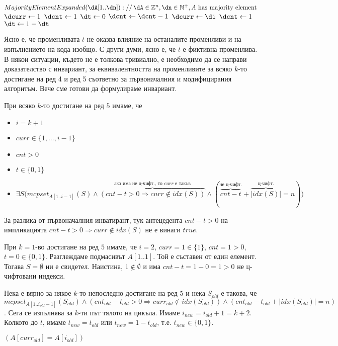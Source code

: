 \begin{solution}
\begin{pseudocode}
		$MajorityElementExpanded(\dA[1..\dn])://\,\dA\in\mathbb{Z}^n,\dn\in\mathbb{N}^+,A\text{ has majority element}$
		\Mybegin
		{	
			$\dcurr\leftarrow1$\;
			$\dcnt\leftarrow1$\;
			\textcolor{red}{$\dt\leftarrow0$\;}
			{
				\Else
				{
					$\dcnt\leftarrow\dcnt-1$\;
					{
						$\dcurr\leftarrow\di$\;
						$\dcnt\leftarrow1$\;
						\textcolor{red}{$\dt\leftarrow1-\dt$\;}
					}
				}
			}
			\KwRet{$\dA[\dcurr]$\;}
		}
	\end{pseudocode}
	Ясно е, че променливата $t$ не оказва влияние на останалите променливи и на изпълнението на кода изобщо. С други думи, ясно е, че $t$ е фиктивна променлива. В някои ситуации, където не е толкова тривиално, е необходимо да се направи доказателство с инвариант, за еквивалентността на променливите за всяко $k$-то достигане на ред 4 и ред 5 съответно за първоначалния и модифицирания алгоритъм. Вече сме готови да формулираме инвариант.
		\begin{boxinvariant*}{}{}
		При всяко $k$-то достигане на ред $5$ имаме, че
		\begin{itemize}
			\item $i=k+1$
			\item $curr\in\{1,\dots,i-1\}$
			\item $cnt>0$
			\item $t\in\{0,1\}$
			\vspace{-0.5cm}
			\item $\exists S\big(mcpset_{A[1..i-1]}(S)\!\land\!\overbrace{(cnt-t>0\!\Rightarrow\! curr\!\notin\! idx(S))}^{\text{ако има не ц-чифт., то }curr\text{ е такъв}}\!\land(\overbrace{cnt-t}^{\text{не ц-чифт.}}\!+\!\overbrace{|idx(S)|}^{\text{ц-чифт.}}\!=\!n)\big)$
		\end{itemize}
	\end{boxinvariant*}
	\begin{remark*}
		За разлика от първоначалния инватирант, тук антецедента $cnt-t>0$ на импликацията $cnt-t>0\Rightarrow curr\notin idx(S)$ не е винаги $true$.
	\end{remark*}
	\begin{base}
		При $k\!=\!1$-во достигане на ред $5$ имаме, че $i\!=\!2$, $curr\!=\!1\!\in\!\{1\}$, $cnt\!=\!1\!>\!0$, $t\!=\!0\!\in\!\{0,1\}$. Разглеждаме подмасивът $A[1..1]$. Той е съставен от един елемент. Тогава $S=\emptyset$ ни е свидетел. Наистина, $1\!\notin\!\emptyset$ и има $cnt\!-\!t\!=\!1\!-\!0\!=\!1\!>\!0$ не ц-чифтовани индекси. 
	\end{base}
	\begin{maintenance}
		Нека е вярно за някое $k$-то непоследно достигане на ред $5$ и нека $S_{old}$ е такова, че $mcpset_{A[1..i_{old}-1]}(S_{old})\land(cnt_{old}-t_{old}>0\Rightarrow curr_{old}\notin idx(S_{old}))\land(cnt_{old}-t_{old}+|idx(S_{old})|=n)$. Сега се изпълнява за $k$-ти път тялото на цикъла. Имаме $i_{new}=i_{old}\!+\!1=k\!+\!2$. Колкото до $t$, имаме $t_{new}=t_{old}$ или $t_{new}=1-t_{old}$, т.е. $t_{new}\in\{0,1\}$.
		\begin{mycase}
			\item $(A[curr_{old}]=A[i_{old}])$
			

\end{mycase}
\end{maintenance}
\end{solution}

